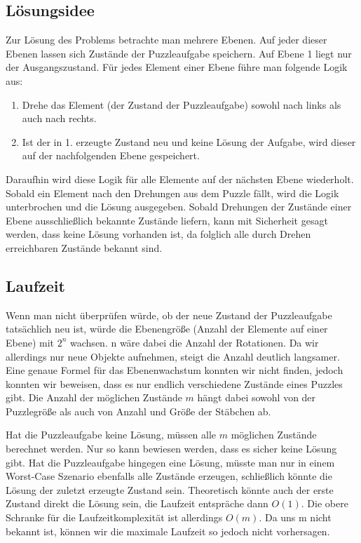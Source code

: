 \subsection {Lösungsidee}
	Zur Lösung des Problems betrachte man mehrere Ebenen. Auf jeder dieser Ebenen lassen sich Zustände der Puzzleaufgabe speichern. 
	Auf Ebene 1 liegt nur der Ausgangszustand. Für jedes Element einer Ebene führe man folgende Logik aus:

	\begin{enumerate}
		\item Drehe das Element (der Zustand der Puzzleaufgabe) sowohl nach links als auch nach rechts.
		\item Ist der in 1. erzeugte Zustand neu und keine Lösung der Aufgabe, wird dieser auf der nachfolgenden Ebene gespeichert.
	\end{enumerate}

	Daraufhin wird diese Logik für alle Elemente auf der nächsten Ebene wiederholt.
	Sobald ein Element nach den Drehungen aus dem Puzzle fällt, wird die Logik unterbrochen und die Lösung ausgegeben. Sobald Drehungen der Zustände einer Ebene ausschließlich bekannte Zustände liefern, kann mit Sicherheit gesagt werden, dass keine Lösung vorhanden ist, da folglich alle durch Drehen erreichbaren Zustände bekannt sind.
	
\subsection{Laufzeit}
	Wenn man nicht überprüfen würde, ob der neue Zustand der Puzzleaufgabe tatsächlich neu ist, würde die Ebenengröße (Anzahl der Elemente auf einer Ebene) mit \(2^n\) wachsen.  
	n wäre dabei die Anzahl der Rotationen. Da wir allerdings nur neue Objekte aufnehmen, steigt die Anzahl deutlich langsamer. 
	Eine genaue Formel für das Ebenenwachstum konnten wir nicht finden, jedoch konnten wir beweisen, dass es nur endlich verschiedene Zustände eines Puzzles gibt. Die Anzahl der möglichen Zustände \(m\) hängt dabei sowohl von der Puzzlegröße als auch von Anzahl und Größe der Stäbchen ab.

	Hat die Puzzleaufgabe keine Lösung, müssen alle \(m\) möglichen Zustände berechnet werden. Nur so kann bewiesen werden, dass es sicher keine Lösung gibt.
	Hat die Puzzleaufgabe hingegen eine Lösung, müsste man nur in einem Worst-Case Szenario ebenfalls alle Zustände erzeugen, schließlich könnte die Lösung der zuletzt erzeugte Zustand sein. Theoretisch könnte auch der erste Zustand direkt die Lösung sein, die Laufzeit entspräche dann \(O(1)\).
	Die obere Schranke für die Laufzeitkomplexität ist allerdings \(O(m)\). Da uns m nicht bekannt ist, können wir die maximale Laufzeit so jedoch nicht vorhersagen.

